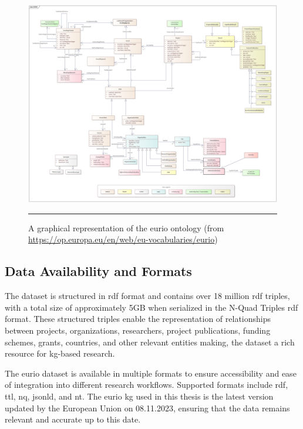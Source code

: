 \begin{figure}[htbp]
    \centering
 \includegraphics[width=\textwidth]{figures/architecture/EURIO_V2.4.png}
     \rule{35em}{0.5pt}
    \caption{A graphical representation of the \gls{eurio} ontology (from \url{https://op.europa.eu/en/web/eu-vocabularies/eurio})}
 \label{fig:eurio-ontology}
\end{figure}

\subsection*{Data Availability and Formats}
The dataset is structured in \gls{rdf} format and contains over 18 million \gls{rdf} triples, with a total size of approximately 5GB when serialized in the N-Quad Triples \gls{rdf} format.
These structured triples enable the representation of relationships between projects, organizations, researchers, project publications, funding schemes, grants, countries, and other relevant entities making, the dataset a rich resource for \gls{kg}-based research.

The \gls{eurio} dataset is available in multiple formats to ensure accessibility and ease of integration into different research workflows.
Supported formats include \gls{rdf}, \gls{ttl}, \gls{nq}, \gls{jsonld}, and \gls{nt}.
The \gls{eurio} \gls{kg} used in this thesis is the latest version updated by the European Union on 08.11.2023, ensuring that the data remains relevant and accurate up to this date.

